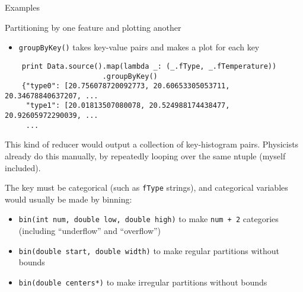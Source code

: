 \documentclass{beamer}
\begin{document}
\begin{frame}[fragile]{Examples}
\begin{block}{Partitioning by one feature and plotting another}
\begin{itemize}
\item {\tt groupByKey()} takes key-value pairs and makes a plot for each key
\end{itemize}
\vspace{-0.5\baselineskip}
{\scriptsize \begin{verbatim}
    print Data.source().map(lambda _: (_.fType, _.fTemperature))
                       .groupByKey()
    {"type0": [20.756078720092773, 20.60653305053711, 20.34678840637207, ...
     "type1": [20.01813507080078, 20.524988174438477, 20.92605972290039, ...
     ...
\end{verbatim}}
\vspace{-0.5\baselineskip}
This kind of reducer would output a collection of key-histogram pairs. Physicists already do this manually, by repeatedly looping over the same ntuple (myself included).

\vfill
The key must be categorical (such as {\tt fType} strings), and categorical variables would usually be made by binning:
\begin{itemize}
\item {\tt bin(int num, double low, double high)} to make {\tt num + 2} categories (including ``underflow'' and ``overflow'')
\item {\tt bin(double start, double width)} to make regular partitions without bounds
\item {\tt bin(double centers*)} to make irregular partitions without bounds
\end{itemize}
\end{block}
\end{frame}
\end{document}
